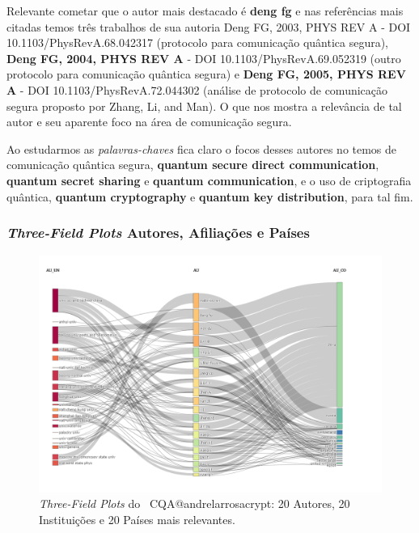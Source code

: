 Relevante cometar que o autor mais destacado é \textbf{deng fg} e nas referências mais citadas temos três trabalhos de sua autoria \textbf{}{Deng FG, 2003, PHYS REV A} - DOI 10.1103/PhysRevA.68.042317 (protocolo para comunicação quântica segura), \textbf{Deng FG, 2004, PHYS REV A} - DOI 10.1103/PhysRevA.69.052319 (outro protocolo para comunicação quântica segura) e \textbf{Deng FG, 2005, PHYS REV A} - DOI 10.1103/PhysRevA.72.044302 (análise de protocolo de comunicação segura proposto por Zhang, Li, and Man). O que nos mostra a relevância de tal autor e seu aparente foco na área de comunicação segura.

Ao estudarmos as \textit{palavras-chaves} fica claro o focos desses autores no temos de comunicação quântica segura, \textbf{quantum secure direct communication}, \textbf{quantum secret sharing} e \textbf{quantum communication}, e o uso de criptografia quântica, \textbf{quantum cryptography} e \textbf{quantum key distribution}, para tal fim.


\subsubsection{\textit{Three-Field Plots} Autores, Afiliações e Países}

\begin{figure}
    \centering
    \includegraphics[angle=0,width=1\textwidth]{experiments/andrelarrosacrypt/AnaliseBibliometrica/CriptografiaQuantica/imagens/CQA@andrelarrosacrypt_Aut_Aff_Coun.png}
    \caption{\textit{Three-Field Plots} do \dataset\ CQA@andrelarrosacrypt: 20 Autores, 20 Instituições e 20 Países mais relevantes.}
    \label{CQA@andrelarrosacrypt_Aut_Aff_Coun}
\end{figure}


